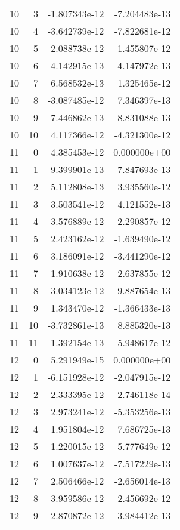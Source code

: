 \begin{tabular}{rrrr}
  10 &    3 & -1.807343e-12 & -7.204483e-13 \\
  10 &    4 & -3.642739e-12 & -7.822681e-12 \\
  10 &    5 & -2.088738e-12 & -1.455807e-12 \\
  10 &    6 & -4.142915e-13 & -4.147972e-13 \\
  10 &    7 &  6.568532e-13 &  1.325465e-12 \\
  10 &    8 & -3.087485e-12 &  7.346397e-13 \\
  10 &    9 &  7.446862e-13 & -8.831088e-13 \\
  10 &   10 &  4.117366e-12 & -4.321300e-12 \\
  11 &    0 &  4.385453e-12 &  0.000000e+00 \\
  11 &    1 & -9.399901e-13 & -7.847693e-13 \\
  11 &    2 &  5.112808e-13 &  3.935560e-12 \\
  11 &    3 &  3.503541e-12 &  4.121552e-13 \\
  11 &    4 & -3.576889e-12 & -2.290857e-12 \\
  11 &    5 &  2.423162e-12 & -1.639490e-12 \\
  11 &    6 &  3.186091e-12 & -3.441290e-12 \\
  11 &    7 &  1.910638e-12 &  2.637855e-12 \\
  11 &    8 & -3.034123e-12 & -9.887654e-13 \\
  11 &    9 &  1.343470e-12 & -1.366433e-13 \\
  11 &   10 & -3.732861e-13 &  8.885320e-13 \\
  11 &   11 & -1.392154e-13 &  5.948617e-12 \\
  12 &    0 &  5.291949e-15 &  0.000000e+00 \\
  12 &    1 & -6.151928e-12 & -2.047915e-12 \\
  12 &    2 & -2.333395e-12 & -2.746118e-14 \\
  12 &    3 &  2.973241e-12 & -5.353256e-13 \\
  12 &    4 &  1.951804e-12 &  7.686725e-13 \\
  12 &    5 & -1.220015e-12 & -5.777649e-12 \\
  12 &    6 &  1.007637e-12 & -7.517229e-13 \\
  12 &    7 &  2.506466e-12 & -2.656014e-13 \\
  12 &    8 & -3.959586e-12 &  2.456692e-12 \\
  12 &    9 & -2.870872e-12 & -3.984412e-13 \\

\end{tabular}
